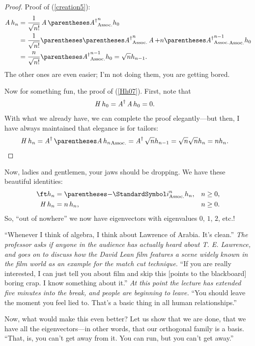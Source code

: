 \documentclass[10pt, a4paper, twoside]{lecturenotes}
\newcommand{\opAdag}{\adj{\opA}}
\begin{document}
\begin{lecture}[date=2013-03-28]
\begin{proposition}
\begin{proof}
  Proof of (\ref{creation5}):
  \begin{align*}
  \opA h_n &= \frac{1}{\sqrt{\Factorial n}} \opA\pa{\opAdag}^n h_0 \\
  &= \frac{1}{\sqrt{\Factorial n}}\pa{\pa{\opAdag}^n\opA + n \pa{\opAdag}^{n-1}}h_0\\
  &= \frac{n}{\sqrt{\Factorial n}} \pa{\opAdag}^{n-1} h_0 = \sqrt{n} h_{n-1}\text.
  \end{align*}
  The other ones are even easier; I'm not doing them, you are getting bored.

  Now for something fun, the proof of (\ref{Hh07}). First, note that
  \begin{align*}
    \opH h_0 &= \opAdag \opA h_0 = 0\text.
  \end{align*}
  With what we already have, we can complete the proof elegantly---but then, I have always maintained that elegance is for tailors:
 \begin{align*}
   \opH h_n &= \opAdag \pa{\opA h_n} = \opAdag \sqrt{n} h_{n-1} = \sqrt{n} \sqrt{n} h_n = n h_n\text.
 \end{align*}
\end{proof}
\end{proposition}
Now, ladies and gentlemen, your jaws should be dropping. We have these beautiful identities:
\begin{align*}
  \ft h_n &= \pa{-\I}^n h_n \text, && n \geq 0 \text,\\
  \opH h_n &= n\, h_n\text, && n \geq 0 \text.
\end{align*}
So, ``out of nowhere'' we now have eigenvectors with eigenvalues $0$, $1$, $2$, etc.!

``Whenever I think of algebra, I think about Lawrence of Arabia. It's clean.'' \emph{The professor asks if anyone in the audience has actually heard about T. E. Lawrence, and goes on to discuss how the David Lean film features a scene widely known in the film world as an example for the match cut technique.} ``If you are really interested, I can just tell you about film and skip this [points to the blackboard] boring crap. I know something about it.'' \emph{At this point the lecture has extended five minutes into the break, and people are beginning to leave.}
``You should leave the moment you feel lied to. That's a basic thing in all human relationships.''

Now, what would make this even better? Let us show that we are done, that we have all the eigenvectors---in other words, that our orthogonal family is a basis. ``That, is, you can't get away from it. You can run, but you can't get away.''


\end{lecture}
\end{document}
